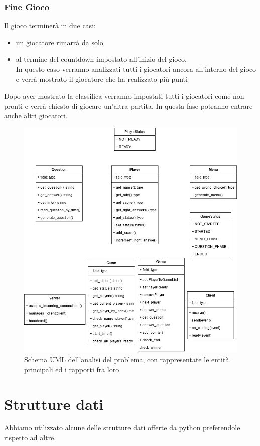 \documentclass[a4paper,12pt]{report}
\begin{document}
\subsection{Fine Gioco}
Il gioco terminerà in due casi:
\begin{itemize}
	\item un giocatore rimarrà da solo 
	\item al termine del countdown impostato all'inizio del gioco.\\ In questo caso verranno analizzati tutti i giocatori ancora all'interno del gioco e verrà mostrato il giocatore che ha realizzato più punti
\end{itemize}
Dopo aver mostrato la classifica verranno impostati tutti i giocatori come non pronti e verrà chiesto di giocare un'altra partita. In questa fase potranno entrare anche altri giocatori.\clearpage

\begin{figure}[h]
\includegraphics[width=\textwidth,height=\textheight,keepaspectratio]{img/uml.jpg}
\caption{Schema UML dell'analisi del problema, con rappresentate le entità principali ed i rapporti fra loro}
\end{figure}

\chapter{Strutture dati}
Abbiamo utilizzato alcune delle strutture dati offerte da python preferendole rispetto ad altre.
\end{document}
